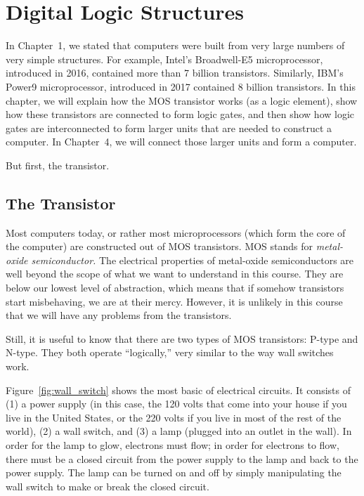 \documentclass{patt}
\begin{document}

\chapter{Digital Logic Structures}
\label{chapt:logic}

In Chapter~1, we stated that computers were built from very large
numbers of very simple structures.  For example, Intel's Broadwell-E5
microprocessor, introduced in 2016, contained more than 7 billion
transistors.  Similarly, IBM's Power9 microprocessor, introduced in
2017 contained 8 billion transistors.  In this chapter, we will explain 
how the MOS transistor works (as a logic element), show how these transistors
are connected to form logic gates, and then show how logic gates
are interconnected to form larger units that are needed to
construct a computer.  In Chapter~4, we will connect those larger
units and form a computer.

But first, the transistor.


\section{The Transistor}
Most computers today, or rather most microprocessors (which form the
core of the computer) are constructed out of MOS transistors.  MOS
stands for {\em metal-oxide semiconductor.}  The electrical properties
of   metal-oxide
semiconductors are well beyond the scope of what we want to understand
in this course.  They are below our lowest level of abstraction, which
means that if somehow transistors start misbehaving, we are at their
mercy.  However, it is unlikely in this course that we will have any problems 
from the transistors.

Still, it is useful to know that there are two types of MOS
transistors: P-type and N-type.  They both operate ``logically,'' very
similar to the way wall switches work.

Figure~\ref{fig:wall_switch} shows the most basic of electrical circuits.
It consists of (1) a power supply (in this case, the 120 volts that come 
into your house if you live in the United States, or the 220 volts if you 
live in most of the rest of the world), (2) a wall
switch, and (3) a lamp (plugged into an outlet in the wall).  In order for
the lamp to glow, electrons must flow; in order for electrons to flow,
there must be a closed circuit from the power supply to the lamp and
back to the power supply.  The lamp can be turned on and off by simply
manipulating the wall switch to make or break the closed circuit.
\end{document}
